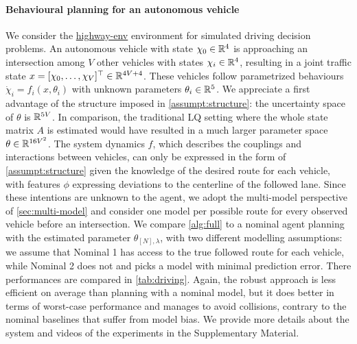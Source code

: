 \documentclass{article}
\begin{document}
\paragraph{Behavioural planning for an autonomous vehicle}
We consider the \href{https://github.com/eleurent/highway-env}{highway-env} environment \citep{highway-env} for simulated driving decision problems. An autonomous vehicle with state $\chi_0\in\mathbb{R}^4$ is approaching an intersection among $V$ other vehicles with states $\chi_i\in\mathbb{R}^4$, resulting in a joint traffic state $x = [\chi_0, \dots,\chi_V]^\top\in\mathbb{R}^{4V+4}$. These vehicles follow parametrized behaviours $\dot{\chi}_i=f_i(x,\theta_i)$ with unknown parameters $\theta_i\in\mathbb{R}^5$. We appreciate a first advantage of the structure imposed in \autoref{assumpt:structure}: the uncertainty space of $\theta$ is $\mathbb{R}^{5V}$. In comparison, the traditional LQ setting where the whole state matrix $A$ is estimated would have resulted in a much larger parameter space $\theta\in\mathbb{R}^{16V^2}$.
The system dynamics $f$, which describes the couplings and interactions between vehicles, can only be expressed in the form of \autoref{assumpt:structure} given the knowledge of the desired route for each vehicle, with features $\phi$ expressing deviations to the centerline of the followed lane. Since these intentions are unknown to the agent, we adopt the multi-model perspective of \autoref{sec:multi-model} and consider one model per possible route for every observed vehicle before an intersection. We compare \autoref{alg:full} to a nominal agent planning with the estimated parameter $\theta_{[N],\lambda}$, with two different modelling assumptions: we assume that Nominal 1 has access to the true followed route for each vehicle, while Nominal 2 does not and picks a model with minimal prediction error. There performances are compared in \autoref{tab:driving}. Again, the robust approach is less efficient on average than planning with a nominal model, but it does better in terms of worst-case performance and manages to avoid collisions, contrary to the nominal baselines that suffer from model bias. We provide more details about the system and videos of the experiments in the Supplementary Material.
\end{document}
